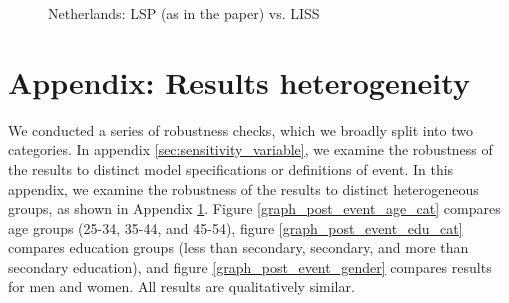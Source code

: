 \begin{figure}
    \caption{Netherlands: LSP (as in the paper) vs. LISS}
    \label{graph_sensitivity_NE}
\end{figure}


\clearpage
\setcounter{table}{0}
\setcounter{figure}{0}
\renewcommand*\thetable{\Alph{section}.\arabic{table}}
\renewcommand*\thefigure{\Alph{section}.\arabic{figure}}
\renewcommand{\theHfigure}{\Alph{section}.\arabic{table}}
\renewcommand{\theHtable}{\Alph{section}.\arabic{figure}}

\section{Appendix: Results heterogeneity}\label{sec:sensitivity_heterogeneity}

We conducted a series of robustness checks, which we broadly split into two categories.  In appendix \ref{sec:sensitivity_variable}, we examine the robustness of the results to distinct model specifications or definitions of event.  In this appendix, we examine the robustness of the results to distinct heterogeneous groups, as shown in Appendix \ref{sec:sensitivity_heterogeneity}.  Figure \ref{graph_post_event_age_cat} compares age groups (25-34, 35-44, and 45-54), figure \ref{graph_post_event_edu_cat} compares education groups (less than secondary, secondary, and more than secondary education), and figure \ref{graph_post_event_gender} compares results for men and women.  All results are qualitatively similar.

